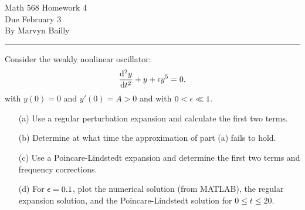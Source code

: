 \documentclass[12pt]{report}
\begin{document}
\large

\begin{center}
 Math 568 Homework 4\\
 Due February 3\\
 By Marvyn Bailly\\
\end{center}

\normalsize

\hrule



\begin{problem}
    Consider the weakly nonlinear oscillator:
    \[ 
        \frac{\mathrm{d}^{2} y}{\mathrm{d} t^{2}} + y + {\epsilon} y^5 = 0,
    \]
    with $y(0) = 0$ and $y'(0) = A > 0$ and with $0 < {\epsilon} \ll 1.$
    \begin{enumerate}
        \item [(a)]
        Use a regular perturbation expansion and calculate the first two terms. 
        

        \item [(b)]
        Determine at what time the approximation of part (a) fails to hold.
        

        \item [(c)]
        Use a Poincare-Lindstedt expansion and determine the first two terms and frequency corrections.
        
        
        \item [(d)]
        For ${\epsilon} = 0.1$, plot the numerical solution (from MATLAB), the regular expansion solution, and
        the Poincare-Lindstedt solution for $0 \leq t \leq 20$.
        


    \end{enumerate}
\end{problem}
\end{document}
